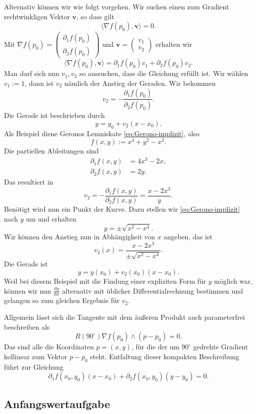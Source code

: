 Alternativ können wir wie folgt vorgehen. Wir suchen einen zum
Gradient rechtwinkligen Vektor $\mathbf v$, so dass gilt%
\[\langle\nabla f(p_0),\mathbf v\rangle = 0.\]
Mit $\nabla f(p_0) = \begin{pmatrix}\partial_1 f(p_0)\\ \partial_2 f(p_0)\end{pmatrix}$
und $\mathbf v = \begin{pmatrix}v_1\\ v_2\end{pmatrix}$ erhalten wir
\[\langle\nabla f(p_0),\mathbf v\rangle
= \partial_1 f(p_0)v_1 + \partial_2 f(p_0)v_2.\]
Man darf sich nun $v_1,v_2$ so aussuchen, dass die Gleichung erfüllt
ist. Wir wählen $v_1:=1$, dann ist $v_2$ nämlich der Anstieg der
Geraden. Wir bekommen
\[v_2 = -\frac{\partial_1 f(p_0)}{\partial_2 f(p_0)}.\]
Die Gerade ist beschrieben durch
\[y = y_0 + v_2(x-x_0).\]
Als Beispiel diene Geronos Lemniskate
\eqref{eq:Gerono-implizit}, also
\[f(x,y) := x^4+y^2-x^2.\]
Die partiellen Ableitungen sind
\begin{align*}
\partial_1 f(x,y) &= 4x^3-2x,\\
\partial_2 f(x,y) &= 2y.
\end{align*}
Das resultiert in
\[v_2 = -\frac{\partial_1 f(x,y)}{\partial_2 f(x,y)}
= \frac{x-2x^3}{y}.\]
Benötigt wird nun ein Punkt der Kurve. Dazu stellen wir
\eqref{eq:Gerono-implizit} nach $y$ um und erhalten
\[y = \pm\sqrt{x^2-x^4}.\]
Wir können den Anstieg nun in Abhängigkeit von $x$ angeben, das ist
\[v_2(x) = \frac{x-2x^3}{\pm\sqrt{x^2-x^4}}.\]
Die Gerade ist
\[y = y(x_0) + v_2(x_0)(x-x_0).\]
Weil bei diesem Beispiel mit die Findung einer expliziten Form für $y$
möglich war, können wir nun $\frac{\mathrm dy}{\mathrm dx}$ alternativ
mit üblicher Differentialrechnung bestimmen und gelangen so zum
gleichen Ergebnis für $v_2$.

Allgemein lässt sich die Tangente mit dem äußeren Produkt auch
parameterfrei beschreiben als
\[R(90^\circ)\nabla f(p_0)\wedge (p-p_0) = 0.\]
Das sind alle die Koordinaten $p=(x,y)$, für die der um $90^\circ$
gedrehte Gradient kollinear zum Vektor $p-p_0$ steht. Entfaltung
dieser kompakten Beschreibung führt zur Gleichung%
\[\partial_1 f(x_0,y_0)(x-x_0) + \partial_2 f(x_0,y_0)(y-y_0) = 0.\]

\subsection{Anfangswertaufgabe}

